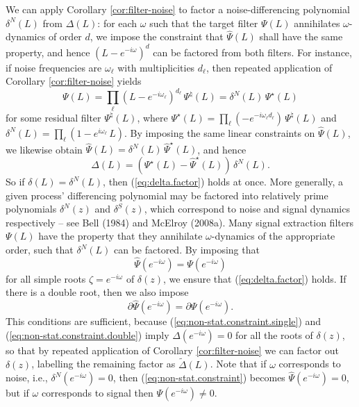 \documentclass[a4paper]{book}
\begin{document}
 We can apply Corollary \ref{cor:filter-noise} to factor a 
 noise-differencing polynomial $\delta^N (L)$ from $\Delta (L)$:
 for each $\omega$ such that the target filter $\Psi (L)$ annihilates
 $\omega$-dynamics of order $d$, we impose the constraint
 that $\widehat{\Psi} (L)$ shall have the same property, and hence 
 ${(L- e^{-i \omega})}^d$ can be factored from both
 filters.   For instance, if noise frequencies are $\omega_{\ell}$
 with multiplicities $d_{\ell}$, then repeated application of
 Corollary \ref{cor:filter-noise} yields
\[
 \Psi (L) = \prod_{\ell} {(L -  e^{-i \omega_{\ell}})}^{d_{\ell}} \, \Psi^{\natural} (L)
   = \delta^N (L) \, \Psi^{\star} (L)
\]
 for some residual filter $\Psi^{\natural} (L)$, where 
 $\Psi^{\star} (L) = \prod_{\ell} (-e^{-i \omega_{\ell} d_{\ell}}) \, \Psi^{\natural} (L)$
 and $\delta^N (L) = \prod_{\ell} (1 - e^{i \omega_{\ell}} \, L)$.
 By imposing the same linear constraints on $\widehat{\Psi} (L)$, 
 we likewise obtain $\widehat{\Psi} (L) = \delta^N (L) \, \widehat{\Psi}^{\star} (L)$,
 and hence
\begin{equation}
 \label{eq:delta-noise}
\Delta (L) = \left(  {\Psi}^{\star} (L) - 
\widehat{\Psi}^{\star} (L) \right) \, \delta^N (L).
\end{equation}
  So if $\delta (L) = \delta^N (L)$, then (\ref{eq:delta.factor}) 
  holds at once.  More generally, a given process' differencing polynomial
 may be factored into relatively prime polynomials $\delta^N (z)$ and $\delta^S (z)$, 
 which correspond to noise and signal dynamics
 respectively -- see Bell (1984) and McElroy (2008a). 
 Many  signal extraction filters $\Psi (L)$   have the property that they
 annihilate $\omega$-dynamics of the appropriate order, 
 such that $\delta^N (L)$ can be factored.
 By imposing that 
\begin{equation}
\label{eq:non-stat.constraint.single}
 \widehat{\Psi} (e^{-i \omega}) = \Psi (e^{-i \omega})
 \end{equation}
 for  all simple roots $\zeta = e^{-i \omega}$ of $\delta (z)$, we ensure that
  (\ref{eq:delta.factor}) holds. If there is a double root, then we also impose
 \begin{equation}
\label{eq:non-stat.constraint.double}
 \partial \widehat{\Psi} (e^{-i \omega}) = \partial \Psi (e^{-i \omega}).
 \end{equation}
   This conditions are sufficient, because 
  (\ref{eq:non-stat.constraint.single}) and  (\ref{eq:non-stat.constraint.double})
    imply $\Delta (e^{-i \omega}) = 0$
  for all the roots of $\delta (z)$, so that by repeated application of Corollary 
 \ref{cor:filter-noise} we can factor out $\delta (z)$, labelling the
 remaining factor as $\widetilde{\Delta } (L)$.  
   Note that if $\omega$ corresponds to noise, i.e., $\delta^N (e^{-i \omega}) = 0$,
    then (\ref{eq:non-stat.constraint}) becomes 
  $ \widehat{\Psi} (e^{-i \omega}) = 0$, but if $\omega$ corresponds to signal
  then $\Psi (e^{-i \omega}) \neq 0$. 
  
\end{document}
